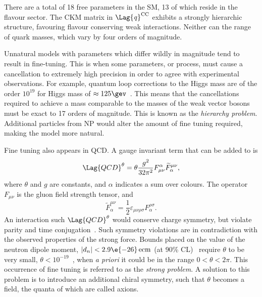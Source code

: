 There are a total of 18 free parameters in the SM, 13 of which reside in the flavour sector.
The CKM matrix in $\Lag{\it q}^\mathrm{CC}$ exhibits a strongly hierarchic structure, favouring
flavour conserving weak interactions.
Neither can the range of quark masses, which vary by four orders of magnitude.

Unnatural models with parameters which differ wildly in magnitude tend to result in fine-tuning.
This is when some parameters, or process, must cause a cancellation to extremely high precision in
order to agree with experimental observations.
For example, quantum loop corrections to the Higgs mass are of the order $10^{19}$ for Higgs mass
of $\approx125\gev$~\cite{Chatrchyan:2012ufa,Aad:2012tfa}.
This means that the cancellations required to achieve a mass comparable to the masses of the weak
vector bosons must be exact to 17 orders of magnitude.
This is known as the \emph{hierarchy problem}.
Additional particles from NP would alter the amount of fine tuning required, making the model more
natural.

Fine tuning also appears in QCD.
A gauge invariant term that can be added to  is
\begin{equation}
  \Lag{QCD}^\theta = \theta\frac{g^2}{32\pi^2}
  F_{\mu\nu}^\alpha\widetilde F^{\mu\nu}_\alpha,
\end{equation}
where $\theta$ and $g$ are constants, and $\alpha$ indicates a sum over colours.
The operator $F_{\mu\nu}$ is the gluon field strength tensor, and
\begin{equation}
  \widetilde F^{\mu\nu}_\alpha = \frac12\varepsilon_{\mu\nu\rho\sigma}F^{\rho\sigma}_\alpha.
\end{equation}
An interaction such $\Lag{QCD}^\theta$ would conserve charge symmetry, but violate parity and time
conjugation~\cite{Peccei:2006as}.
Such symmetry violations are in contradiction with the observed properties of the strong
force.
Bounds placed on the value of the neutron dipole moment, $|d_n| <2.9\e{-26}\,\mathrm{ecm}$
(at 90\% CL)~\cite{Baker:2006ts} require $\theta$ to be very small,
$\theta<10^{-19}$~\cite{Crewther:PQref9}, when \emph{a priori} it could be in the range
$0<\theta<2\pi$.
This occurrence of fine tuning is referred to as the \emph{strong \CP problem}.
A solution to this problem is to introduce an additional chiral symmetry, such that $\theta$
becomes a field, the quanta of which are called axions.



